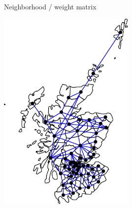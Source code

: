 \documentclass[11pt,ignorenonframetext,]{beamer}
\begin{document}
\begin{frame}{Neighborhood / weight matrix}
\protect\hypertarget{neighborhood-weight-matrix}{}

\vspace{-4mm}

\begin{center}\includegraphics[width=0.5\textwidth]{Lec19_files/figure-beamer/unnamed-chunk-3-1} \end{center}

\end{frame}
\end{document}

